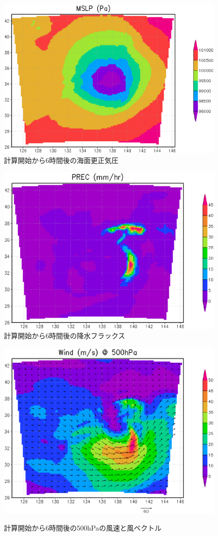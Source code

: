 \begin{figure}[h]
\begin{center}
  \includegraphics[width=0.55\hsize]{./figure/real_mslp.eps}\\
  \caption{計算開始から6時間後の海面更正気圧}
  \label{fig:real_mslp}
\end{center}
\begin{center}
  \includegraphics[width=0.55\hsize]{./figure/real_prec.eps}\\
  \caption{計算開始から6時間後の降水フラックス}
  \label{fig:real_prec}
\end{center}
\begin{center}
  \includegraphics[width=0.55\hsize]{./figure/real_wind.eps}\\
  \caption{計算開始から6時間後の500hPaの風速と風ベクトル}
  \label{fig:real_wind}
\end{center}
\end{figure}


